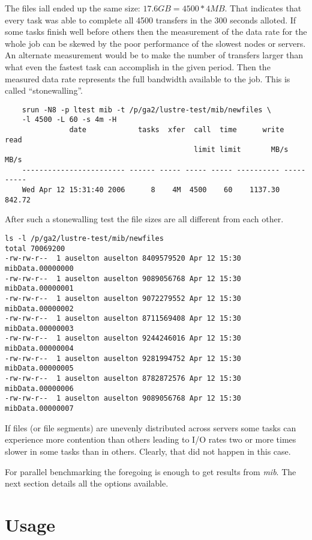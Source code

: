 \documentclass{article}
\begin{document}
The files iall ended up the same size: $17.6GB = 4500 * 4MB$.  That
indicates that every task was able to complete all 4500 transfers in
the 300 seconds alloted.  If some tasks finish well before others then
the measurement of the data rate for the whole job can be skewed by
the poor performance of the slowest nodes or servers.  An alternate
measurement would be to make the number of transfers larger than what
even the fastest task can accomplish in the given period.  Then the
measured data rate represents the full bandwidth available to the job.
This is called ``stonewalling''.  
{\small
  \begin{verbatim}
    srun -N8 -p ltest mib -t /p/ga2/lustre-test/mib/newfiles \
    -l 4500 -L 60 -s 4m -H
               date            tasks  xfer  call  time      write       read
                                            limit limit       MB/s       MB/s
    ------------------------ ------ ----- ----- ----- ---------- ----------
    Wed Apr 12 15:31:40 2006      8    4M  4500    60    1137.30     842.72
  \end{verbatim}
}
After such a stonewalling test the file sizes are all different
from each other. 
{\small
  \begin{verbatim}
ls -l /p/ga2/lustre-test/mib/newfiles
total 70069200
-rw-rw-r--  1 auselton auselton 8409579520 Apr 12 15:30 mibData.00000000
-rw-rw-r--  1 auselton auselton 9089056768 Apr 12 15:30 mibData.00000001
-rw-rw-r--  1 auselton auselton 9072279552 Apr 12 15:30 mibData.00000002
-rw-rw-r--  1 auselton auselton 8711569408 Apr 12 15:30 mibData.00000003
-rw-rw-r--  1 auselton auselton 9244246016 Apr 12 15:30 mibData.00000004
-rw-rw-r--  1 auselton auselton 9281994752 Apr 12 15:30 mibData.00000005
-rw-rw-r--  1 auselton auselton 8782872576 Apr 12 15:30 mibData.00000006
-rw-rw-r--  1 auselton auselton 9089056768 Apr 12 15:30 mibData.00000007
  \end{verbatim}
}
If files (or file segments) are unevenly distributed across servers
some tasks can experience more contention than others leading to I/O
rates two or more times slower in some tasks than in others.  Clearly, that
did not happen in this case.

For parallel benchmarking the foregoing is enough to get results from
{\em mib}.  The next section details all the options available.  

\section{Usage}\label{section.usage} 
\end{document}
